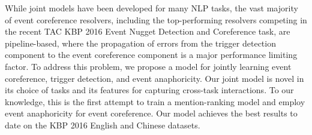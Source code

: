 While joint models have been developed for many NLP tasks, the vast majority of event coreference resolvers, including the top-performing resolvers competing in the recent TAC KBP 2016 Event Nugget Detection and Coreference task, are pipeline-based, where the propagation of errors from the trigger detection component to the event coreference component is a major performance limiting factor. To address this problem, we propose a model for jointly learning event coreference, trigger detection, and event anaphoricity. Our joint model is novel in its choice of tasks and its features for capturing cross-task interactions. To our knowledge, this is the first attempt to train a mention-ranking model and employ event anaphoricity for event coreference. Our model achieves the best results to date on the KBP 2016 English and Chinese datasets.
